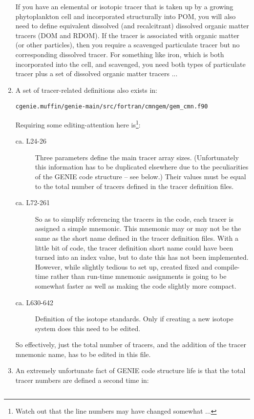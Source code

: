 \documentclass[11pt,fleqn]{book} %
\begin{document}
\begin{enumerate}
If you have an elemental or isotopic tracer that is taken up by a growing phytoplankton cell and incorporated structurally into POM, you will also need to define equivalent dissolved (and recalcitrant) dissolved organic matter tracers (DOM and RDOM). If the tracer is associated with organic matter (or other particles), then you require a scavenged particulate tracer but no corresponding dissolved tracer. For something like iron, which is both incorporated into the cell, and scavenged, you need both types of particulate tracer plus a set of dissolved organic matter tracers ...
\item 
A set of tracer-related definitions also exists in:
\vspace{-10pt}\begin{verbatim}
cgenie.muffin/genie-main/src/fortran/cmngem/gem_cmn.f90
\end{verbatim}\vspace{-10pt}
Requiring some editing-attention here is\footnote{Watch out that the line numbers may have changed somewhat ...}:
\begin{description}
\item[ca. L24-26] Three parameters define the main tracer array sizes. (Unfortunately this information has to be duplicated elsewhere due to the peculiarities of the GENIE code structure -- see below.) Their values must be equal to the total number of tracers defined in the tracer definition files.
\item[ca. L72-261] So as to simplify referencing the tracers in the code, each tracer is assigned a simple mnemonic. This mnemonic may or may not be the same as the short name defined in the tracer definition files. With a little bit of code, the tracer definition short name could have been turned into an index value, but to date this has not been implemented. However, while slightly tedious to set up, created fixed and compile-time rather than run-time mnemonic assignments is going to be somewhat faster as well as making the code slightly more compact.
\item[ca. L630-642] Definition of the isotope standards. Only if creating a new isotope system does this need to be edited.
\end{description}
So effectively, just the total number of tracers, and the addition of the tracer mnemonic name, has to be edited in this file.
\item
An extremely unfortunate fact of GENIE code structure life is that the total tracer numbers are defined a second time in:
\vspace{-10pt}\begin{verbatim}

\end{verbatim}
\end{enumerate}
\end{document}
